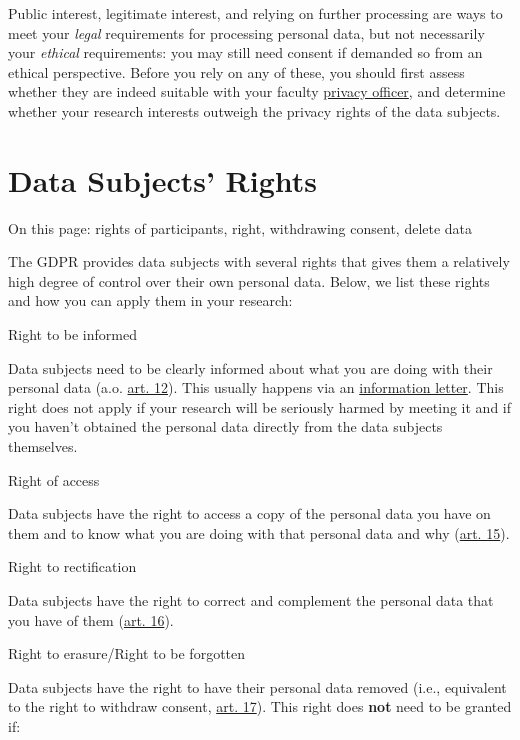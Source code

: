 \documentclass[
]{book}
\begin{document}
Public interest, legitimate interest, and relying on further processing are ways
to meet your \emph{legal} requirements for processing personal data, but not
necessarily your \emph{ethical} requirements: you may still need consent if demanded
so from an ethical perspective. Before you rely on any of these, you should
first assess whether they are indeed suitable with your faculty \protect\hyperlink{support}{privacy officer},
and determine whether your research interests outweigh the privacy rights of
the data subjects.

\hypertarget{data-subject-rights}{%
\section{Data Subjects' Rights}\label{data-subject-rights}}

On this page: rights of participants, right, withdrawing consent, delete data

The GDPR provides data subjects with several rights that gives them a relatively
high degree of control over their own personal data. Below, we list these rights
and how you can apply them in your research:

Right to be informed

Data subjects need to be clearly informed about what you are doing with their
personal data (a.o. \href{https://gdpr-info.eu/art-12-gdpr/}{art. 12}).
This usually happens via an \protect\hyperlink{privacy-notices}{information letter}. This right
does not apply if your research will be seriously harmed by meeting it and if
you haven't obtained the personal data directly from the data subjects themselves.

Right of access

Data subjects have the right to access a copy of the personal data you have
on them and to know what you are doing with that personal data and why
(\href{https://gdpr-info.eu/art-15-gdpr/}{art. 15}).

Right to rectification

Data subjects have the right to correct and complement the personal data
that you have of them
(\href{https://gdpr-info.eu/art-16-gdpr/}{art. 16}).

Right to erasure/Right to be forgotten

Data subjects have the right to have their personal data removed (i.e.,
equivalent to the right to withdraw consent,
\href{https://gdpr-info.eu/art-17-gdpr/}{art. 17}).
This right does \textbf{not} need to be granted if:
\end{document}
